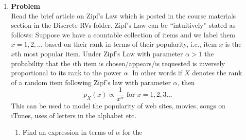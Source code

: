 \documentclass[12pt]{article}
\newenvironment{Ex}{\textbf{Problem}\vspace{.75em}\\}{}
\begin{document}
\begin{enumerate}
\begin{Ex}
\begin{solution}
\begin{enumerate}
          In this case, the quality of service $q$ is the probability
          that the number of active customers $X$ will rise above
          $m=4$, i.e. $P(X>4)$, and signal an overload. Since each
          customer's activity is mutually independent, we can use a
          Binomial Random Variable, $X$ $\sim$ Binomial, to model the
          activity.
          \begin{equation}
            \label{eq:5-p-desc}
            P(X) = {x \choose 10} (0.05)^x(0.95)^{10-x}
          \end{equation}
          Thus, the probability that $X>4$ (overload condition) can be
          modeled by
          \begin{equation}
            \label{eq:5-p-sol}
            \begin{aligned}
              P(X>4) &= \sum_{i=5}^{10} {i \choose 10}
              (0.05)^i(0.95)^{10-i} \\
              &= 0.000063689831 \\
            \end{aligned}
          \end{equation}
        \end{enumerate}
      \end{solution}
    \end{Ex}
  \item
    \begin{Ex}
      Read the brief article on Zipf's Law which is posted in the
      course materials section in the Discrete RVs folder. Zipf's Law
      can be ``intuitively'' stated as follows: Suppose we have a
      countable collection of items and we label them $x = 1,2,
      \ldots$ based on their rank in terms of their popularity, i.e.,
      item $x$ is the $x$th most popular item. Under Zipf's Law with
      parameter $\alpha > 1$ the probability that the $i$th item is
      chosen/appears/is requested is inversely proportional to its
      rank to the power $\alpha$. In other words if $X$ denotes the
      rank of a random item following Zipf's law with parameter
      $\alpha$, then
      \begin{equation}
        \label{eq:zipfs-prob}
        p_X(x) \propto \frac{1}{x^\alpha} \text{ for } x = 1, 2, 3 \ldots
    \end{equation}
      This can be used to model the popularity of web sites, movies,
      songs on iTunes, uses of letters in the alphabet etc.
      \begin{enumerate}
      \item Find an expression in terms of $\alpha$ for the

\end{enumerate}
\end{Ex}
\end{enumerate}
\end{document}

